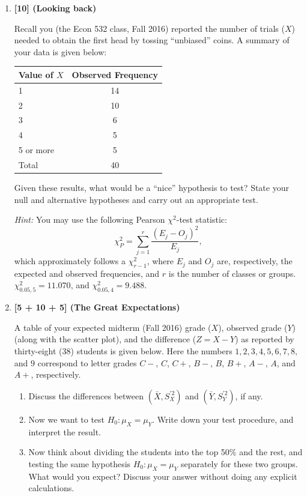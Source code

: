 \documentclass[11pt]{article}
\begin{document}
\begin{enumerate}[label=\arabic*.,leftmargin=*,itemsep=1.5em]

\item \textbf{[10] (Looking back)}

Recall you (the Econ 532 class, Fall 2016) reported the number of trials ($X$)
needed to obtain the first head by tossing ``unbiased'' coins. A summary of
your data is given below:

\begin{center}
\begin{tabular}{lc}
\toprule
Value of $X$ & Observed Frequency \\
\midrule
1 & 14 \\
2 & 10 \\
3 & 6 \\
4 & 5 \\
5 or more & 5 \\
\midrule
Total & 40 \\
\bottomrule
\end{tabular}
\end{center}

Given these results, what would be a ``nice'' hypothesis to test? State your
null and alternative hypotheses and carry out an appropriate test.

\textit{Hint:} You may use the following Pearson $\chi^2$-test statistic:
\[
\chi_P^2=\sum_{j=1}^{r}\frac{(E_j-O_j)^2}{E_j},
\]
which approximately follows a $\chi^2_{r-1}$, where $E_j$ and $O_j$ are,
respectively, the expected and observed frequencies, and $r$ is the number
of classes or groups. $\chi^2_{0.05,5}=11.070$, and
$\chi^2_{0.05,4}=9.488$.

\item \textbf{[5 + 10 + 5] (The Great Expectations)}

A table of your expected midterm (Fall 2016) grade ($X$), observed grade
($Y$) (along with the scatter plot), and the difference ($Z=X-Y$) as
reported by thirty-eight (38) students is given below. Here the numbers
$1,2,3,4,5,6,7,8,$ and $9$ correspond to letter grades
$C-$, $C$, $C+$, $B-$, $B$, $B+$, $A-$, $A$, and $A+$, respectively.

\begin{enumerate}[label=(\roman*),leftmargin=2em]
\item Discuss the differences between $(\bar X,S_X^{\prime 2})$ and
$(\bar Y,S_Y^{\prime 2})$, if any.
\item Now we want to test $H_0:\mu_X=\mu_Y$. Write down your test
procedure, and interpret the result.
\item Now think about dividing the students into the top 50\% and the rest,
and testing the same hypothesis $H_0:\mu_X=\mu_Y$ separately for these
two groups. What would you expect? Discuss your answer without doing any
explicit calculations.
\end{enumerate}


\end{enumerate}
\end{document}
